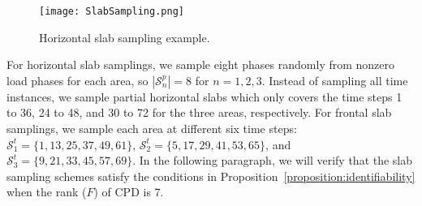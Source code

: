 \documentclass[journal]{IEEEtran}
\begin{document}
\begin{figure}
    \centering
  \texttt{[image: SlabSampling.png]}
    \caption{Horizontal slab sampling example.}
    \label{fig:slab}
\end{figure}

 For horizontal slab samplings, we sample eight phases randomly from nonzero load phases for each area, so $|\mathcal{S}_n^p|=8$ for $n=1,2,3$. Instead of sampling all time instances, we sample partial horizontal slabs which only covers the time steps 1 to 36, 24 to 48, and 30 to 72 for the three areas, respectively. For frontal slab samplings, we sample each area at  different six time steps:  $\mathcal{S}_1^t=\{1, 13, 25, 37, 49, 61\}$, $\mathcal{S}_2^t=\{5, 17, 29, 41, 53, 65\}$, and $\mathcal{S}_3^t=\{9, 21, 33, 45, 57, 69\}$. In the following paragraph, we will verify that the slab sampling schemes satisfy the conditions in Proposition~\ref{proposition:identifiability} when the rank ($F$) of CPD is 7.
\end{document}
